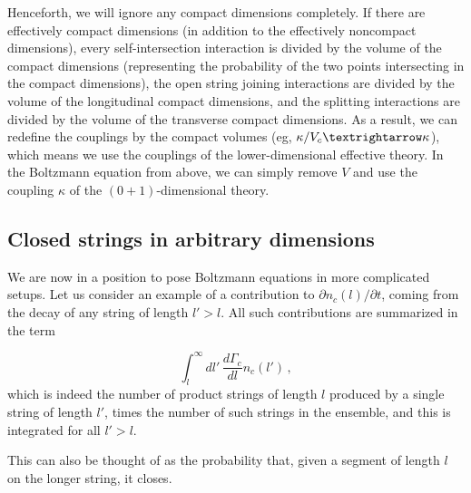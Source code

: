 \documentclass[a4paper,11pt]{article}
\begin{document}
Henceforth, we will ignore any compact dimensions completely. If there are
effectively compact dimensions (in addition to the effectively noncompact
dimensions), every self-intersection interaction is divided by the volume
of the compact dimensions (representing the probability of the two points
intersecting in the compact dimensions), the open string joining interactions
are divided by the volume of the longitudinal compact dimensions, and the
splitting interactions are divided by the volume of the transverse compact
dimensions. As a result, we can redefine the couplings by the compact volumes
(eg, $\kappa/V_c\textrightarrow\kappa$), which means we use the couplings of the 
lower-dimensional effective theory. In the Boltzmann equation from 
\cite{Lowe:1994nm} above, we can simply remove $V$ and use the coupling
$\kappa$ of the $(0+1)$-dimensional theory. 


\subsection{Closed strings in arbitrary dimensions}
We are now in a position to pose Boltzmann equations in more complicated setups.
Let us consider an example of a contribution to $\partial n_c(l)/\partial t$, coming from the decay of any string of length $l'>l$.
All such contributions are summarized in the term

\begin{equation}
    \int_l^\infty{dl'\,\frac{d\Gamma_{c}}{dl}n_c(l')}\, ,
\end{equation}
which is indeed the number of product strings of length $l$ produced by a single string of length $l'$, times the number of such strings in the ensemble, and this is integrated
for all $l'>l$.

This can also be thought of as the probability that,
given a segment of length $l$ on the longer string, it closes.
\end{document}
